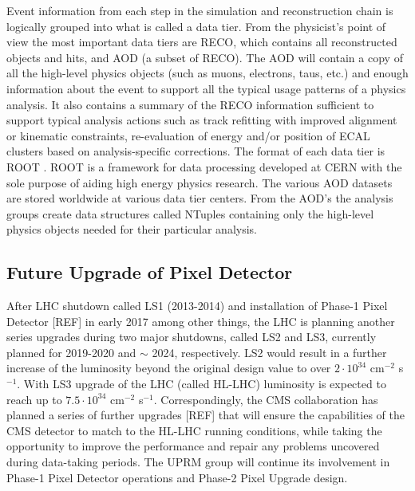 Event information from each step in the simulation and reconstruction chain is logically grouped into what is called a data tier\cite{CMScomp1}. From the physicist's point of view the most important data tiers are RECO, which contains all reconstructed objects and hits, and AOD (a subset of RECO). The AOD will contain a copy of all the high-level physics objects (such as muons, electrons, taus, etc.) and enough information about the event to support all the typical usage patterns of a physics analysis. It also contains a summary of the RECO information sufficient to support typical analysis actions such as track refitting with improved alignment or kinematic constraints, re-evaluation of energy and/or position of ECAL clusters based on analysis-specific corrections. The format of each data tier is ROOT \cite{ROOT}. ROOT is a framework for data processing developed at CERN with the sole purpose of aiding high energy physics research. The various AOD datasets are stored worldwide at various data tier centers. From the AOD's the analysis groups create data structures called NTuples containing only the high-level physics objects needed for their particular analysis. 

\subsection{Future Upgrade of Pixel Detector}
After LHC shutdown called LS1 (2013-2014) and installation of Phase-1 Pixel Detector [REF] in early 2017 among other things, the LHC is planning another series upgrades during two major shutdowns, called LS2 and LS3, currently planned for 2019-2020 and $\sim$ 2024, respectively. LS2 would result in a further increase of the luminosity beyond the original design value to over $2\cdot{10}^{34}$ cm$^{-2}$ s$^{-1}$.  With LS3 upgrade of the LHC (called HL-LHC) luminosity is expected to reach up to $7.5\cdot{10}^{34}$ cm$^{-2}$ s$^{-1}$. Correspondingly, the CMS collaboration has planned a series of further upgrades [REF] that will ensure the capabilities of the CMS detector to match to the HL-LHC running conditions, while taking the opportunity to improve the performance and repair any problems uncovered during data-taking periods. The UPRM group will continue its involvement in Phase-1 Pixel Detector operations and Phase-2 Pixel Upgrade design.\\

